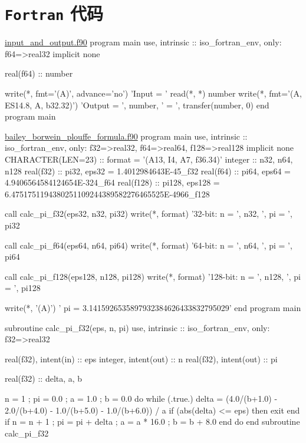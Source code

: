 \section{\texttt{Fortran} 代码}\label{S:appendix-fortran}
\begin{fortran}[label={C:1-1}]{\href{https://github.com/iydon/CFDRust/blob/main/mae5005/code/1/input_and_output.f90}{input\_and\_output.f90}}
program main
   use, intrinsic :: iso_fortran_env, only: f64=>real32
   implicit none

   real(f64) :: number

   write(*, fmt='(A)', advance='no') 'Input  = '
   read(*, *) number
   write(*, fmt='(A, ES14.8, A, b32.32)') 'Output = ', number, ' = ', transfer(number, 0)
end program main
\end{fortran}

\begin{fortran}[label={C:1-2}]{\href{https://github.com/iydon/CFDRust/blob/main/mae5005/code/1/bailey_borwein_plouffe_formula.f90}{bailey\_borwein\_plouffe\_formula.f90}}
program main
   use, intrinsic :: iso_fortran_env, only: f32=>real32, f64=>real64, f128=>real128
   implicit none
   CHARACTER(LEN=23) :: format = '(A13, I4, A7, f36.34)'
   integer :: n32, n64, n128
   real(f32) :: pi32, eps32 = 1.4012984643E-45_f32
   real(f64) :: pi64, eps64 = 4.9406564584124654E-324_f64
   real(f128) :: pi128, eps128 = 6.4751751194380251109244389582276465525E-4966_f128

   call calc_pi_f32(eps32, n32, pi32)
   write(*, format) '32-bit: n = ', n32, ', pi = ', pi32

   call calc_pi_f64(eps64, n64, pi64)
   write(*, format) '64-bit: n = ', n64, ', pi = ', pi64

   call calc_pi_f128(eps128, n128, pi128)
   write(*, format) '128-bit: n = ', n128, ', pi = ', pi128

   write(*, '(A)') '                   pi = 3.1415926535897932384626433832795029'
end program main

subroutine calc_pi_f32(eps, n, pi)
   use, intrinsic :: iso_fortran_env, only: f32=>real32

   real(f32), intent(in) :: eps
   integer, intent(out) :: n
   real(f32), intent(out) :: pi

   real(f32) :: delta, a, b

   n = 1 ; pi = 0.0 ; a = 1.0 ; b = 0.0
   do while (.true.)
      delta = (4.0/(b+1.0) - 2.0/(b+4.0) - 1.0/(b+5.0) - 1.0/(b+6.0)) / a
      if (abs(delta) <= eps) then
         exit
      end if
      n = n + 1 ; pi = pi + delta ; a = a * 16.0 ; b = b + 8.0
   end do
end subroutine calc_pi_f32


\end{fortran}
